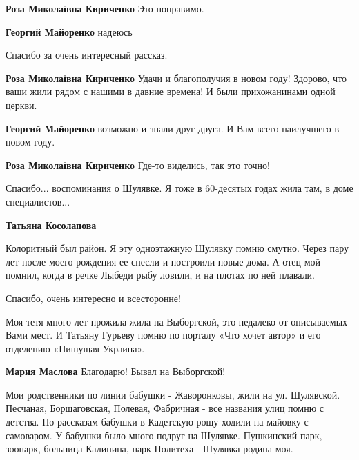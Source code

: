 \begin{itemize}
\begin{itemize}
\textbf{Роза Миколаївна Кириченко} Это поправимо.

\textbf{Георгий Майоренко} надеюсь
\end{itemize} %

Спасибо за очень интересный рассказ.

\begin{itemize} %
\textbf{Роза Миколаївна Кириченко} Удачи и благополучия в новом году! Здорово, что ваши жили рядом с нашими в давние времена! И были прихожанинами одной церкви.

\textbf{Георгий Майоренко} возможно и знали друг друга. И Вам всего наилучшего в новом году.

\textbf{Роза Миколаївна Кириченко} Где-то виделись, так это точно!
\end{itemize} %


Спасибо... воспоминания о Шулявке. Я тоже в 60-десятых годах жила там, в доме
специалистов...

\begin{itemize} %
\textbf{Татьяна Косолапова} 

Колоритный был район. Я эту одноэтажную Шулявку помню смутно.
Через пару лет после моего рождения ее снесли и построили новые
дома. А отец мой помнил, когда в речке Лыбеди рыбу ловили, и на
плотах по ней плавали.

\end{itemize} %


Спасибо, очень интересно и всесторонне!

Моя тетя много лет прожила жила на Выборгской, это недалеко от описываемых Вами
мест. И Татьяну Гурьеву помню по порталу «Что хочет автор» и его отделению
«Пишущая Украина».

\textbf{Мария Маслова} Благодарю! Бывал на Выборгской!


Мои родственники по линии бабушки - Жаворонковы, жили на ул. Шулявской.
Песчаная, Борщаговская, Полевая, Фабричная - все названия улиц помню с
детства. По рассказам бабушки в Кадетскую рощу ходили на майовку с самоваром. У
бабушки было много подруг на Шулявке. Пушкинский парк, зоопарк, больница
Калинина, парк Политеха - Шулявка родина моя.


\end{itemize}

